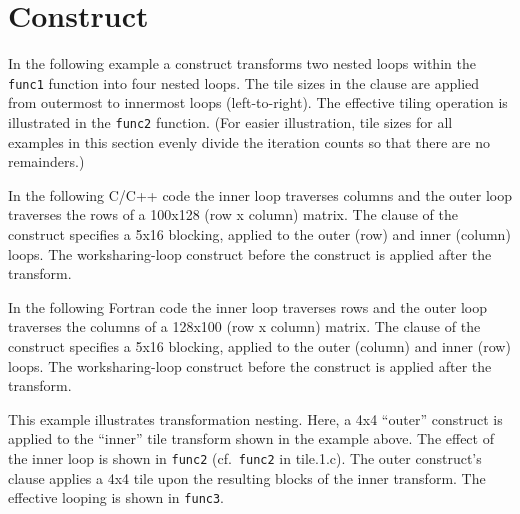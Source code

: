 \section{ Construct}
\label{sec:tile}

In the following example a  construct transforms two nested loops
within the \texttt{func1} function into four nested loops.
The tile sizes in the  clause are applied from outermost
to innermost loops (left-to-right). The effective tiling operation is illustrated in
the \texttt{func2} function. 
(For easier illustration, tile sizes for all examples in this section evenly 
divide the iteration counts so that there are no remainders.)

In the following C/C++ code the inner loop traverses columns
and the outer loop traverses the rows of a 100x128 (row x column) matrix.  
The  clause of the  construct specifies
a 5x16 blocking, applied to the outer (row) and inner (column) loops.
The worksharing-loop construct before the 
construct is applied after the transform.


In the following Fortran code the inner loop traverses rows 
and the outer loop traverses the columns of a 128x100 (row x column) matrix.  
The   clause of the  construct specifies 
a 5x16 blocking, applied to the outer (column) and inner (row) loops.
The worksharing-loop construct before the 
construct is applied after the transform.

\clearpage

This example illustrates transformation nesting.
Here, a 4x4 ``outer''   construct is applied to the ``inner'' tile transform shown in the example above.
The effect of the inner loop is shown in \texttt{func2} (cf.\ \texttt{func2} in tile.1.c).
The outer  construct's  clause applies a 4x4 tile upon the resulting
blocks of the inner transform.  The effective looping is shown in \texttt{func3}.

